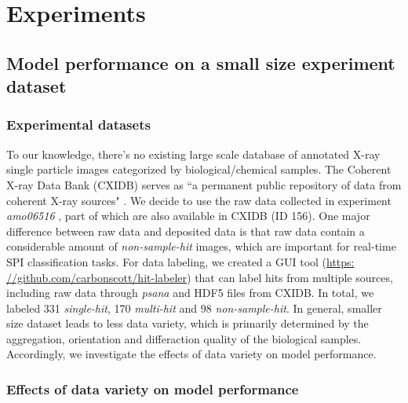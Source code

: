 \section{Experiments}

\subsection{Model performance on a small size experiment dataset}

\subsubsection{Experimental datasets}

To our knowledge, there's no existing large scale database of annotated X-ray
single particle images categorized by biological/chemical samples.  The Coherent
X-ray Data Bank (CXIDB) serves as ``a permanent public repository of data from
coherent X-ray sources" \cite{maiaCoherentXrayImaging2012}.  We decide to use
the raw data collected in experiment \textit{amo06516}
\cite{liDiffractionDataAerosolized2020}, part of which are also available in
CXIDB (ID 156).  One major difference between raw data and deposited data is
that raw data contain a considerable amount of \textit{non-sample-hit} images,
which are important for real-time SPI classification tasks.  For data labeling,
we created a GUI tool (\url{https:
//github.com/carbonscott/hit-labeler}) that can label hits from multiple sources,
including raw data through \textit{psana} \cite{damianiLinacCoherentLight2016}
and HDF5 files from CXIDB.  In total, we labeled 331 \textit{single-hit}, 170
\textit{multi-hit} and 98 \textit{non-sample-hit}.  In general, smaller size
dataset leads to less data variety, which is primarily determined by the
aggregation, orientation and differaction quality of the biological samples.
Accordingly, we investigate the effects of data variety on model performance.  


\subsubsection{Effects of data variety on model performance}

